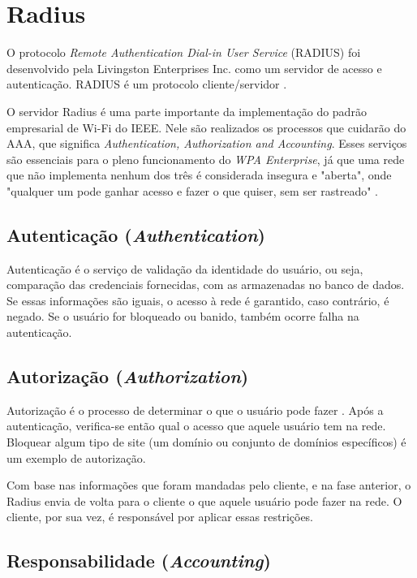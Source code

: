 \section{Radius}

O protocolo \textit{Remote Authentication Dial-in User Service} (RADIUS) foi desenvolvido pela
Livingston Enterprises Inc. como um servidor de acesso e autenticação. RADIUS é um
protocolo cliente/servidor \cite{radius-guide}.


O servidor Radius é uma parte importante da implementação do padrão empresarial
de Wi-Fi do IEEE. Nele são realizados os processos que cuidarão do AAA, que significa
\textit{Authentication, Authorization and Accounting}. Esses serviços são essenciais
para o pleno funcionamento do \textit{WPA Enterprise}, já que uma rede que não implementa
nenhum dos três é considerada insegura e "aberta", onde "qualquer um pode ganhar
acesso e fazer o que quiser, sem ser rastreado" \cite{radius-guide}.

\subsection{Autenticação (\textit{Authentication})}

Autenticação é o serviço de validação da identidade do usuário, ou seja, comparação
das credenciais fornecidas, com as armazenadas no banco de dados. Se essas informações
são iguais, o acesso à rede é garantido, caso contrário, é negado. Se o usuário for
bloqueado ou banido, também ocorre falha na autenticação. \cite{radius-guide}


\subsection{Autorização (\textit{Authorization})}

Autorização é o processo de determinar o que o usuário pode fazer \cite{radius-guide}. Após a
autenticação, verifica-se então qual o acesso que aquele usuário tem na rede. Bloquear
algum tipo de site (um domínio ou conjunto de domínios específicos) é um exemplo
de autorização.

Com base nas informações que foram mandadas pelo cliente, e na fase anterior, o Radius
envia de volta para o cliente o que aquele usuário pode fazer na rede. O cliente,
por sua vez, é responsável por aplicar essas restrições. \cite{radius-guide}

\subsection{Responsabilidade (\textit{Accounting})}

